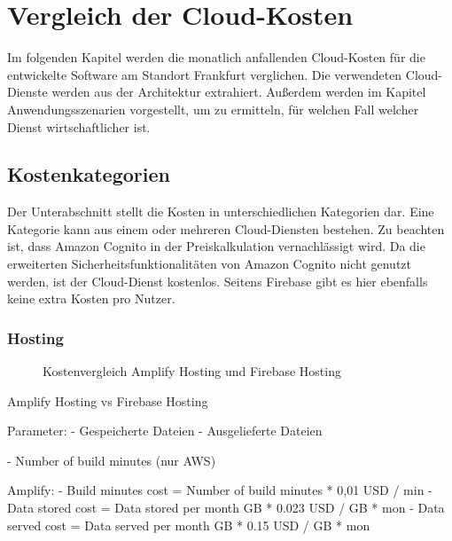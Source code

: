 \chapter{Vergleich der Cloud-Kosten}

Im folgenden Kapitel werden die monatlich anfallenden Cloud-Kosten \autocite{awsPricing} \autocite{gcpPricing} für die entwickelte Software am Standort Frankfurt verglichen. Die verwendeten Cloud-Dienste werden aus der Architektur extrahiert. Außerdem werden im Kapitel Anwendungsszenarien vorgestellt, um zu ermitteln, für welchen Fall welcher Dienst wirtschaftlicher ist.

\section{Kostenkategorien}

Der Unterabschnitt stellt die Kosten in unterschiedlichen Kategorien dar. Eine Kategorie kann aus einem oder mehreren Cloud-Diensten bestehen. Zu beachten ist, dass Amazon Cognito in der Preiskalkulation vernachlässigt wird. Da die erweiterten Sicherheitsfunktionalitäten von Amazon Cognito nicht genutzt werden, ist der Cloud-Dienst kostenlos. Seitens Firebase gibt es hier ebenfalls keine extra Kosten pro Nutzer.

\subsection{Hosting}

\begin{figure}%
    \centering
    \qquad
    \caption{Kostenvergleich Amplify Hosting und Firebase Hosting}%
    \label{kostenvergleichHosting}%
\end{figure}

Amplify Hosting vs Firebase Hosting

Parameter:
- Gespeicherte Dateien
- Ausgelieferte Dateien


- Number of build minutes (nur AWS)


Amplify:
- Build minutes cost = Number of build minutes * 0,01 USD / min
- Data stored cost = Data stored per month GB * 0.023 USD / GB * mon
- Data served cost = Data served per month GB * 0.15 USD / GB * mon

